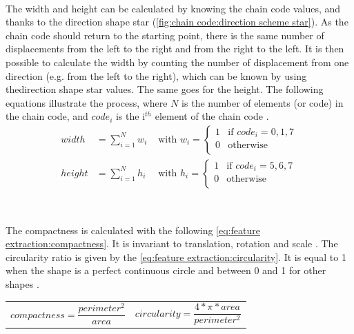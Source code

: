 

~~

The width and height can be calculated by knowing the chain code values, and thanks to the direction shape star (\vref{fig:chain code:direction scheme star}). As the chain code should return to the starting point, there is the same number of displacements from the left to the right and from the right to the left. It is then possible to calculate the width by counting the number of displacement from one direction (e.g. from the left to the right), which can be known by using thedirection shape star values. The same goes for the height. The following equations illustrate the process, where $N$ is the number of elements (or code) in the chain code, and $code_i$ is the i$^{th}$ element of the chain code \cite{bib:chain:ShapeDescription}.
\begin{align}
width &= \sum_{i = 1}^{N} w_i 
& \text{ with } w_i = 
	\begin{cases}
		1 & \text{if } code_i = 0, 1, 7 \\
		0 & \text{otherwise} \\
	\end{cases} \\
height &= \sum_{i = 1}^{N} h_i 
& \text{ with }  h_i = 
	\begin{cases}
		1 & \text{if } code_i = 5, 6, 7 \\
		0 & \text{otherwise} \\
	\end{cases} 
\end{align}


~~

The compactness is calculated with the following \vref{eq:feature extraction:compactness}. It is invariant to translation, rotation and scale  \cite{bib:chain:RepresentationAndDescription}. The circularity ratio is given by the \vref{eq:feature extraction:circularity}. It is equal to 1 when the shape is a perfect continuous circle and between 0 and 1 for other shapes \cite{bib:chain:ObjectDescription}.


\noindent\begin{tabularx}{\textwidth}{@{}XX@{}}
	\begin{equation} \label{eq:feature extraction:compactness}
		compactness = \frac{perimeter^2}{area}
	\end{equation} & 
	\begin{equation} \label{eq:feature extraction:circularity}
		circularity = \frac{4 * \pi * area}{perimeter^2}
	\end{equation}
\end{tabularx}

